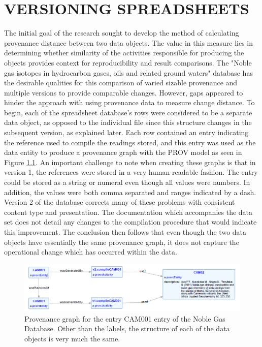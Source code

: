 
\chapter{VERSIONING SPREADSHEETS}\label{ch:spreadsheet}

The initial goal of the research sought to develop the method of calculating provenance distance between two data objects.
The value in this measure lies in determining whether similarity of the activities responsible for producing the objects provides context for reproducibility and result comparisons.
The "Noble gas isotopes in hydrocarbon gases, oils and related ground waters" database has the desirable qualities for this comparison of varied sizable provenance and multiple versions to provide comparable changes.
However, gaps appeared to hinder the approach with using provenance data to measure change distance.
To begin, each of the spreadsheet database's rows were considered to be a separate data object, as opposed to the individual file since this structure changes in the subsequent version, as explained later.
Each row contained an entry indicating the reference used to compile the readings stored, and this entry was used as the data entity to produce a provenance graph with the PROV model as seen in Figure \ref{CAM001ProvGraph}.
An important challenge to note when creating these graphs is that in version 1, the references were stored in a very human readable fashion.
The entry could be stored as a string or numeral even though all values were numbers.
In addition, the values were both comma separated and ranges indicated by a dash.
Version 2 of the database corrects many of these problems with consistent content type and presentation.
The documentation which accompanies the data set does not detail any changes to the compilation procedure that would indicate this improvement.
The conclusion then follows that even though the two data objects have essentially the same provenance graph, it does not capture the operational change which has occurred within the data.

\begin{figure}
	\centering
	\includegraphics[scale=0.70]{figures/CAM001v1v2.png}
	\caption{Provenance graph for the entry CAM001 entry of the Noble Gas Database.  Other than the labels, the structure of each of the data objects is very much the same.}
	\label{CAM001ProvGraph}
\end{figure}

